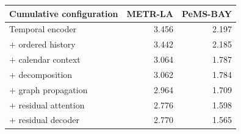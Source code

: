 \begin{tabular}{lrr}
\toprule
Cumulative configuration & METR-LA & PeMS-BAY\\
\midrule
Temporal encoder & 3.456 & 2.197\\
$+$ ordered history & 3.442 & 2.185\\
$+$ calendar context & 3.064 & 1.787\\
$+$ decomposition & 3.062 & 1.784\\
$+$ graph propagation & 2.964 & 1.709\\
$+$ residual attention & 2.776 & 1.598\\
$+$ residual decoder & 2.770 & 1.565\\
\bottomrule
\end{tabular}
